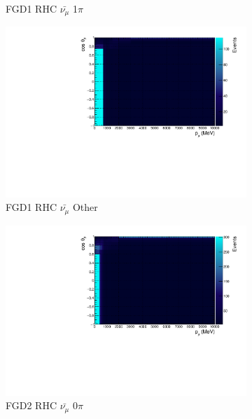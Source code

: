 \begin{figure}
\begin{subfigure}{.32\textwidth}
  \caption{FGD1 RHC $\bar{\nu_{\mu}}$ 1$\pi$}
  \label{fig:th2dth2dFGD1_anti-numuCC_1pi}
\end{subfigure}
\begin{subfigure}{.32\textwidth}
  \centering
  \includegraphics[width=0.95\linewidth]{figs/TH2D_MC_FGD1_anti-numuCC_other}
  \caption{FGD1 RHC $\bar{\nu_{\mu}}$ Other}
  \label{fig:th2dFGD1_anti-numuCC_other}
\end{subfigure}
\centering
\begin{subfigure}{.32\textwidth}
  \centering
  \includegraphics[width=0.95\linewidth]{figs/TH2D_MC_FGD2_anti-numuCC_0pi}
  \caption{FGD2 RHC $\bar{\nu_{\mu}}$ 0$\pi$}
  \label{fig:th2dFGD2_anti-numuCC_0pi}
\end{subfigure}
\begin{subfigure}{.32\textwidth}
  \centering

\end{subfigure}
\end{figure}
